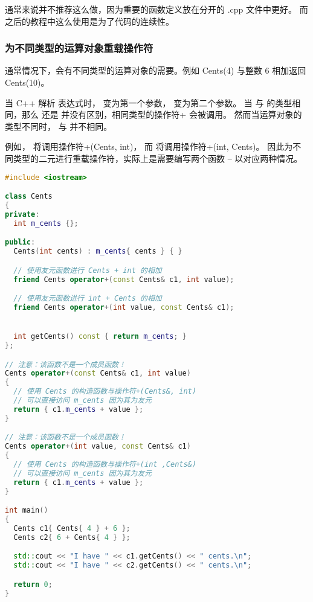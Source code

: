 \documentclass[../../LearnCpp.tex]{subfiles}
\begin{document}
通常来说并不推荐这么做，因为重要的函数定义放在分开的 .cpp 文件中更好。
而之后的教程中这么使用是为了代码的连续性。

\subsubsection*{为不同类型的运算对象重载操作符}

通常情况下，会有不同类型的运算对象的需要。例如 Cents(4) 与整数 6 相加返回 Cents(10)。

当 C++ 解析  表达式时， 变为第一个参数， 变为第二个参数。
当  与  的类型相同，那么  还是  并没有区别，相同类型的操作符+ 会被调用。
然而当运算对象的类型不同时， 与  并不相同。

例如， 将调用操作符+(Cents, int)，
而  将调用操作符+(int, Cents)。
因此为不同类型的二元进行重载操作符，实际上是需要编写两个函数 -- 以对应两种情况。

\begin{lstlisting}[language=C++]
#include <iostream>

class Cents
{
private:
  int m_cents {};

public:
  Cents(int cents) : m_cents{ cents } { }

  // 使用友元函数进行 Cents + int 的相加
  friend Cents operator+(const Cents& c1, int value);

  // 使用友元函数进行 int + Cents 的相加
  friend Cents operator+(int value, const Cents& c1);


  int getCents() const { return m_cents; }
};

// 注意：该函数不是一个成员函数！
Cents operator+(const Cents& c1, int value)
{
  // 使用 Cents 的构造函数与操作符+(Cents&, int)
  // 可以直接访问 m_cents 因为其为友元
  return { c1.m_cents + value };
}

// 注意：该函数不是一个成员函数！
Cents operator+(int value, const Cents& c1)
{
  // 使用 Cents 的构造函数与操作符+(int ,Cents&)
  // 可以直接访问 m_cents 因为其为友元
  return { c1.m_cents + value };
}

int main()
{
  Cents c1{ Cents{ 4 } + 6 };
  Cents c2{ 6 + Cents{ 4 } };

  std::cout << "I have " << c1.getCents() << " cents.\n";
  std::cout << "I have " << c2.getCents() << " cents.\n";

  return 0;
}
\end{lstlisting}
\end{document}
